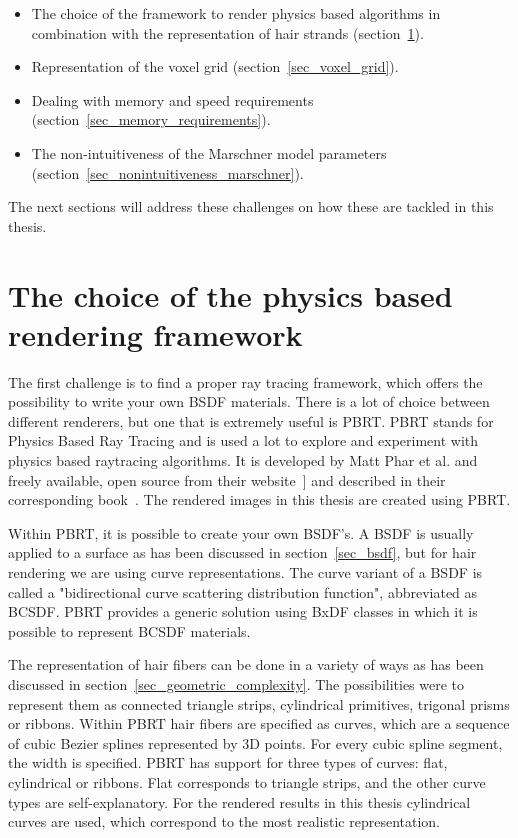\documentclass[11pt,a4paper]{report}
\begin{document}
\begin{itemize}
    \item[1] The choice of the framework to render physics based algorithms in combination with the representation of hair strands (section~\ref{sec_which_framework}).
    \item[2] Representation of the voxel grid (section~\ref{sec_voxel_grid}).
    \item[3] Dealing with memory and speed requirements (section~\ref{sec_memory_requirements}).
    \item[4] The non-intuitiveness of the Marschner model parameters (section~\ref{sec_nonintuitiveness_marschner}).
\end{itemize}

The next sections will address these challenges on how these are tackled in this thesis.


\section{The choice of the physics based rendering framework}
\label{sec_which_framework}

The first challenge is to find a proper ray tracing framework, which offers the possibility to write your own BSDF materials. There is a lot of choice between different renderers, but one that is extremely useful is PBRT. PBRT stands for Physics Based Ray Tracing and is used a lot to explore and experiment with physics based raytracing algorithms. It is developed by Matt Phar et al. and freely available, open source from their website~] and described in their corresponding book~\cite{pbrt}. The rendered images in this thesis are created using PBRT.

Within PBRT, it is possible to create your own BSDF's. A BSDF is usually applied to a surface as has been discussed in section~\ref{sec_bsdf}, but for hair rendering we are using curve representations. The curve variant of a BSDF is called a "bidirectional curve scattering distribution function", abbreviated as BCSDF. PBRT provides a generic solution using BxDF classes in which it is possible to represent BCSDF materials.

The representation of hair fibers can be done in a variety of ways as has been discussed in section~\ref{sec_geometric_complexity}. The possibilities were to represent them as connected triangle strips, cylindrical primitives, trigonal prisms or ribbons. Within PBRT hair fibers are specified as curves, which are a sequence of cubic Bezier splines represented by 3D points. For every cubic spline segment, the width is specified. PBRT has support for three types of curves: flat, cylindrical or ribbons. Flat corresponds to triangle strips, and the other curve types are self-explanatory. For the rendered results in this thesis cylindrical curves are used, which correspond to the most realistic representation.
\end{document}
